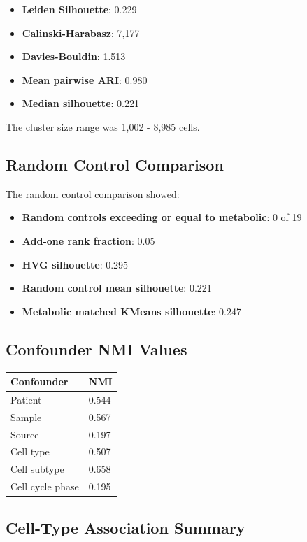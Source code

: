 \documentclass[11pt, a4paper]{article}
\begin{document}
\begin{itemize}
    \item \textbf{Leiden Silhouette}: 0.229
    \item \textbf{Calinski-Harabasz}: 7,177
    \item \textbf{Davies-Bouldin}: 1.513
    \item \textbf{Mean pairwise ARI}: 0.980
    \item \textbf{Median silhouette}: 0.221
\end{itemize}

The cluster size range was 1,002 - 8,985 cells.

\subsection{Random Control Comparison}

The random control comparison showed:

\begin{itemize}
    \item \textbf{Random controls exceeding or equal to metabolic}: 0 of 19
    \item \textbf{Add-one rank fraction}: 0.05
    \item \textbf{HVG silhouette}: 0.295
    \item \textbf{Random control mean silhouette}: 0.221
    \item \textbf{Metabolic matched KMeans silhouette}: 0.247
\end{itemize}

\subsection{Confounder NMI Values}

\begin{tabular}{ll}
\toprule
\textbf{Confounder} & \textbf{NMI} \\
\midrule
Patient & 0.544 \\
Sample & 0.567 \\
Source & 0.197 \\
Cell type & 0.507 \\
Cell subtype & 0.658 \\
Cell cycle phase & 0.195 \\
\bottomrule
\end{tabular}

\subsection{Cell-Type Association Summary}
\end{document}
